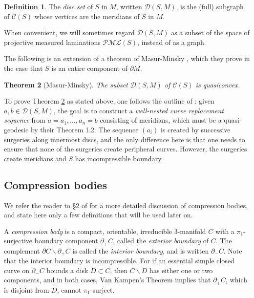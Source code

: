 \documentclass[12pt]{amsart}
\newtheorem{theorem}{Theorem}[section] \newtheorem{philosophy}{Statement}[theorem]
\theoremstyle{definition}
\newtheorem{definition}[theorem]{Definition}
\theoremstyle{remark}
\newcommand{\PML}{{\mathcal P \mathcal M \mathcal L}}
\begin{document}
\begin {definition}
The \emph {disc set} of $S$ in $M$, written $\mathcal D (S,M) $, is the (full) subgraph of  $\mathcal C (S) $ whose vertices are the meridians of $S$ in $M$.
\end {definition}


When convenient, we will sometimes regard $\mathcal D (S,M) $ as a subset of the space of projective measured laminations $\PML(S)$, instead of as a graph. 

\vspace{2mm}

The following is an extension of a theorem of Masur-Minsky \cite [Theorem 1.1]{Masurquasi-convexity}, which they prove in the case that $S $ is an entire component of $\partial M$.

\begin {theorem}[Masur-Minsky]\label {quasi-convexity}
The subset $\mathcal D (S,M) $ of $\mathcal C (S) $ is quasiconvex.
\end {theorem}

To prove Theorem \ref{quasi-convexity} as stated above, one follows the outline of \cite {Masurquasi-convexity}: given $a,b \in \mathcal D (S,M) $, the goal is to construct a \emph {well-nested curve replacement sequence} from $a=a_1,\ldots,a_n=b $ consisting of meridians, which must be a quasi-geodesic by their Theorem 1.2.  The sequence $(a_i)$ is created by successive surgeries along innermost discs, and the only difference here is that one needs to ensure that none of the surgeries create peripheral curves.  However, the surgeries create meridians and $S$ has incompressible boundary.

\medskip

\subsection{Compression bodies}\label{cbodysec}
We refer the reader to \S 2 of \cite{Biringerautomorphisms} for a more detailed discussion of compression bodies, and state here only a few definitions that will be used later on.

A \textit{compression body} is a compact, orientable, irreducible $3$-manifold $C$ with a $\pi_1$-surjective boundary component $\partial_+ C$, called the \emph {exterior boundary} of $C$. The complement $\partial C \smallsetminus \partial_+ C$ is called the \emph {interior boundary}, and is written $\partial_- C$. Note that the interior boundary is incompressible.  For if an essential simple closed curve on $\partial_- C$ bounds a disk $D \subset C$, then $C \smallsetminus  D$ has either one or two components, and in both cases, Van Kampen's Theorem implies that $\partial_+ C$, which is disjoint from $D$, cannot $\pi_1$-surject. 
\end{document}
